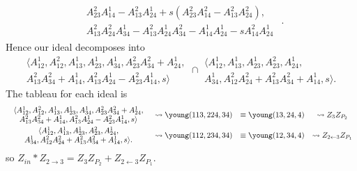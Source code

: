 \documentclass[draft]{article}
\begin{document}
\begin{example}
\[\begin{array}{c|c}
\begin{array}{c}
         A_{23}^2A_{14}^1 - A_{13}^2A_{24}^1 + s(A_{23}^2A_{14}^2 - A_{13}^2A_{24}^2), \\
         A_{13}^2A_{24}^2A_{34}^1 - A_{13}^2A_{24}^1A_{34}^2 - A_{14}^1A_{24}^1 - sA_{14}^2A_{24}^1 
    \end{array} 
\end{array}.
\]
Hence our ideal decomposes into 
\[\begin{array}{c}
     \langle A_{12}^1, A_{12}^2, A_{13}^1, A_{23}^1, A_{34}^1, A_{23}^2A_{34}^2 + A_{24}^1,  \\
     A_{13}^2A_{34}^2 + A_{14}^1, A_{13}^2A_{24}^1 - A_{23}^2A_{14}^1,s \rangle  
\end{array}
 \cap \begin{array}{c}
      \langle A_{12}^1, A_{13}^1, A_{23}^1, A_{23}^2, A_{24}^1,  \\
      A_{34}^1, A_{12}^2A_{24}^2 + A_{13}^2A_{34}^2 + A_{14}^1,s \rangle. 
 \end{array} 
\]
The tableau for each ideal is
\[\begin{array}{cccc}\vspace{1mm}
    \begin{array}{c}
     \langle A_{12}^1, A_{12}^2, A_{13}^1, A_{23}^1, A_{34}^1, A_{23}^2A_{34}^2 + A_{24}^1,  \\
     A_{13}^2A_{34}^2 + A_{14}^1, A_{13}^2A_{24}^1 - A_{23}^2A_{14}^1,s \rangle  
\end{array} &\leadsto \young(113,224,34) &\equiv \young(13,24,4) &\leadsto Z_3 Z_{P_2} \\ 
    \begin{array}{c}
      \langle A_{12}^1, A_{13}^1, A_{23}^1, A_{23}^2, A_{24}^1,  \\
      A_{34}^1, A_{12}^2A_{24}^2 + A_{13}^2A_{34}^2 + A_{14}^1,s \rangle. 
 \end{array} &\leadsto \young(112,234,34) &\equiv \young(12,34,4) &\leadsto Z_{2 \leftarrow 3} Z_{P_1}
\end{array}
\]
so $Z_{in} * Z_{2 \rightarrow 3} = Z_3 Z_{P_2} + Z_{2 \leftarrow 3} Z_{P_1}$.
\end{example}
\end{document}
